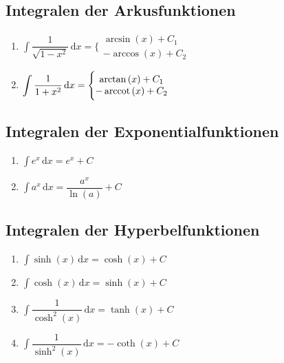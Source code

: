 \subsection{Integralen der Arkusfunktionen}
\begin{enumerate}[$(a)$]
\item $\displaystyle \int \dfrac{1}{\sqrt{1-x^2}}\,\text{d}x=\Bigg\{\begin{matrix}\arcsin\left(x\right)+C_1\\-\arccos\left(x\right)+C_2\end{matrix}$
\item $\displaystyle \int \dfrac{1}{1+x^2}\,\text{d}x=\Bigg\{\begin{matrix}\arctan\left(x\right)+C_1\\-\operatorname{arccot}\left(x\right)+C_2\end{matrix}$
\end{enumerate}
\subsection{Integralen der Exponentialfunktionen}
\begin{enumerate}[$(a)$]
\item $\displaystyle \int e^x\,\text{d}x=e^x+C$
\item $\displaystyle \int a^x\,\text{d}x=\dfrac{a^x}{\ln\left(a\right)}+C$
\end{enumerate}
\subsection{Integralen der Hyperbelfunktionen}
\begin{enumerate}[$(a)$]
\item $\displaystyle \int \sinh\left(x\right)\,\text{d}x=\cosh\left(x\right)+C$
\item $\displaystyle \int \cosh\left(x\right)\,\text{d}x=\sinh\left(x\right)+C$
\item $\displaystyle \int \dfrac{1}{\cosh^2\left(x\right)}\,\text{d}x=\tanh\left(x\right)+C$
\item $\displaystyle \int \dfrac{1}{\sinh^2\left(x\right)}\,\text{d}x=-\coth\left(x\right)+C$
\end{enumerate}

